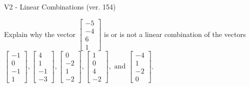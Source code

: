 \begin{exercise}
  \begin{exerciseTitle}V2 - Linear Combinations (ver. 154)\end{exerciseTitle}
  \begin{exerciseStatement}
    Explain why the vector \(\left[\begin{array}{c}
-5 \\
-4 \\
6 \\
1
\end{array}\right]\)  is or is not a linear 
	combination of the vectors \(\left[\begin{array}{c}
-1 \\
0 \\
-1 \\
1
\end{array}\right] , \left[\begin{array}{c}
4 \\
1 \\
-1 \\
-3
\end{array}\right] , \left[\begin{array}{c}
0 \\
-2 \\
1 \\
-2
\end{array}\right] , \left[\begin{array}{c}
1 \\
0 \\
4 \\
-2
\end{array}\right] , \text{ and } \left[\begin{array}{c}
-4 \\
1 \\
-2 \\
0
\end{array}\right]\).
	



\end{exerciseStatement}
\end{exercise}
